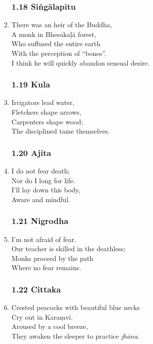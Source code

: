 \documentclass[10pt, openany]{book}
\begin{document}
\begin{enumerate}
\subsubsection*{1.18 Siṅgālapitu}

\item There was an heir of the Buddha,\\
A monk in Bhesakaḷā forest,\\
Who suffused the entire earth \\
With the perception of “bones”.\\
I think he will quickly abandon sensual desire.

\subsubsection*{1.19 Kula}

\item Irrigators lead water,\\
Fletchers shape arrows,\\
Carpenters shape wood;\\
The disciplined tame themselves.

\subsubsection*{1.20 Ajita}

\item I do not fear death;\\
Nor do I long for life.\\
I’ll lay down this body,\\
Aware and mindful.

\subsubsection*{1.21 Nigrodha}

\item I’m not afraid of fear.\\
Our teacher is skilled in the deathless;\\
Monks proceed by the path\\
Where no fear remains.

\subsubsection*{1.22 Cittaka}

\item Crested peacocks with beautiful blue necks\\
Cry out in Karaṃvī.\\
Aroused by a cool breeze,\\
They awaken the sleeper to practice \emph{jhāna}.


\end{enumerate}
\end{document}
